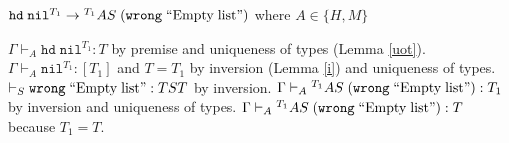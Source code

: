 \begin{case}
$\mathtt{hd}\;\mathtt{nil}^{T_{1}}\rightarrow{^{T_{1}}A}S\;(\mathtt{wrong}\;\mathrm{``Empty\;list"})$ where $A\in\lbrace H,M\rbrace$

$\Gamma\vdash_{A}\mathtt{hd}\;\mathtt{nil}^{T_{1}}:T$ by premise and uniqueness of types (Lemma \ref{uot}).  $\Gamma\vdash_{A}\mathtt{nil}^{T_{1}}:[T_{1}]$ and $T=T_{1}$ by inversion (Lemma \ref{i}) and uniqueness of types.  $\vdash_{S}\mathtt{wrong}\;\mathrm{``Empty\;list"}:TST$ by inversion.  $\Gamma\vdash_{A}{^{T_{1}}A}S\;(\mathtt{wrong}\;\mathrm{``Empty\;list"}):T_{1}$ by inversion and uniqueness of types.  $\Gamma\vdash_{A}{^{T_{1}}A}S\;(\mathtt{wrong}\;\mathrm{``Empty\;list"}):T$ because $T_{1}=T$.
\end{case}